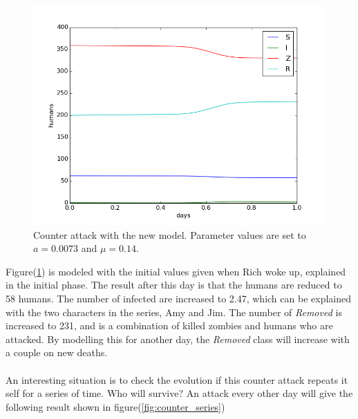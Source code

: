 \documentclass[%
twoside,                 %
final,                   %
10pt]{article}
\begin{document}
\begin{figure}[ht]
  \centerline{\includegraphics[width=0.9\linewidth]{plots/WD_zombie_counter_2.png}}
  \caption{
  \label{fig:zombie_counter_2} Counter attack with the new model. Parameter values are set to $a=0.0073$ and $\mu=0.14$.
  }
\end{figure}


Figure(\ref{fig:zombie_counter_2}) is modeled with the initial values given when Rich woke up, explained in the initial phase. The result after this day is that the humans are reduced to 58 humans. The number of infected are increased to 2.47, which can be explained with the two characters in the series, Amy and Jim. The number of \emph{Removed} is increased to 231, and is a combination of killed zombies and humans who are attacked. By modelling this for another day, the \emph{Removed} class will increase with a couple on new deaths. 
\\
\\
An interesting situation is to check the evolution if this counter attack repeats it self for a series of time. Who will survive? An attack every other day will give the following result shown in figure(\ref{fig:counter_series})
\end{document}
